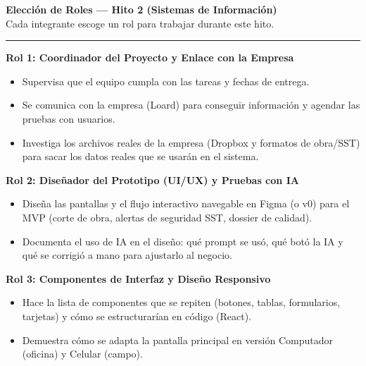 \documentclass[11pt,letterpaper]{article}
\begin{document}
\begin{center}
    {\Large\bfseries\color{primary} Elección de Roles --- Hito 2 (Sistemas de Información)}\\[0.4em]
    {\normalsize Cada integrante escoge un rol para trabajar durante este hito.}
\end{center}

\vspace{0.1cm}
\hrule
\vspace{0.4cm}

\begin{tcolorbox}
    \textbf{\color{primary}Rol 1: Coordinador del Proyecto y Enlace con la Empresa}
    \begin{itemize}
        \item Supervisa que el equipo cumpla con las tareas y fechas de entrega.
        \item Se comunica con la empresa (Loard) para conseguir información y agendar las pruebas con usuarios.
        \item Investiga los archivos reales de la empresa (Dropbox y formatos de obra/SST) para sacar los datos reales que se usarán en el sistema.
    \end{itemize}
\end{tcolorbox}

\begin{tcolorbox}
    \textbf{\color{primary}Rol 2: Diseñador del Prototipo (UI/UX) y Pruebas con IA}
    \begin{itemize}
        \item Diseña las pantallas y el flujo interactivo navegable en Figma (o v0) para el MVP (corte de obra, alertas de seguridad SST, dossier de calidad).
        \item Documenta el uso de IA en el diseño: qué prompt se usó, qué botó la IA y qué se corrigió a mano para ajustarlo al negocio.
    \end{itemize}
\end{tcolorbox}

\begin{tcolorbox}
    \textbf{\color{primary}Rol 3: Componentes de Interfaz y Diseño Responsivo}
    \begin{itemize}
        \item Hace la lista de componentes que se repiten (botones, tablas, formularios, tarjetas) y cómo se estructurarían en código (React).
        \item Demuestra cómo se adapta la pantalla principal en versión Computador (oficina) y Celular (campo).
    \end{itemize}
\end{tcolorbox}
\end{document}
